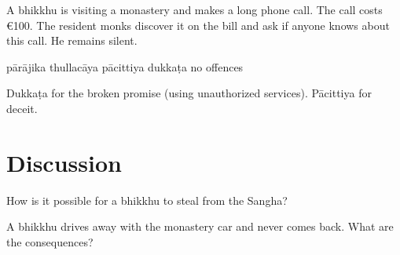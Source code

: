 \begin{exam}{\autoExamName}
\begin{problem*}
\begin{parts}
  \item A bhikkhu is visiting a monastery and makes a long phone call. The call
  costs €100. The resident monks discover it on the bill and ask if
  anyone knows about this call. He remains silent.

  \bigskip

  \begin{answers}{5}
    \bChoices
     pārājika\eAns
     thullacāya\eAns
     pācittiya\eAns
     dukkaṭa\eAns
     no offences\eAns
    \eChoices
  \end{answers}

  \begin{solution}
    Dukkaṭa for the broken promise (using unauthorized services). Pācittiya for deceit.
  \end{solution}

\end{parts}

\end{problem*}

\end{exam}

\section*{Discussion}

How is it possible for a bhikkhu to steal from the Sangha?

\bigskip

A bhikkhu drives away with the monastery car and never comes back.
What are the consequences?

